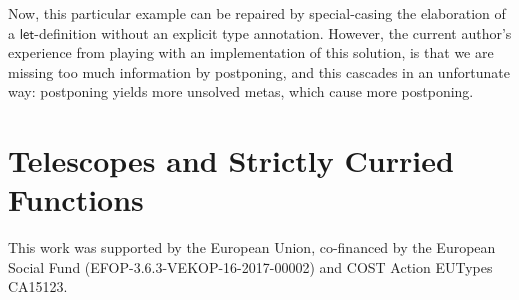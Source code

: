 \documentclass[acmsmall,review,anonymous,prologue,dvipsnames]{acmart}\settopmatter{printfolios=true,printccs=false,printacmref=false}
\newcommand{\slet}{\boldsymbol{\mathsf{let}}}
\theoremstyle{remark}
\begin{document}
Now, this particular example can be repaired by special-casing the elaboration
of a $\slet$-definition without an explicit type annotation. However, the
current author's experience from playing with an implementation of this
solution, is that we are missing too much information by postponing, and this
cascades in an unfortunate way: postponing yields more unsolved metas, which
cause more postponing.

\section{Telescopes and Strictly Curried Functions}














\begin{acks}
  This work was supported by the European Union, co-financed by the
  European Social Fund (EFOP-3.6.3-VEKOP-16-2017-00002) and COST Action
  EUTypes CA15123.
\end{acks}





\end{document}
